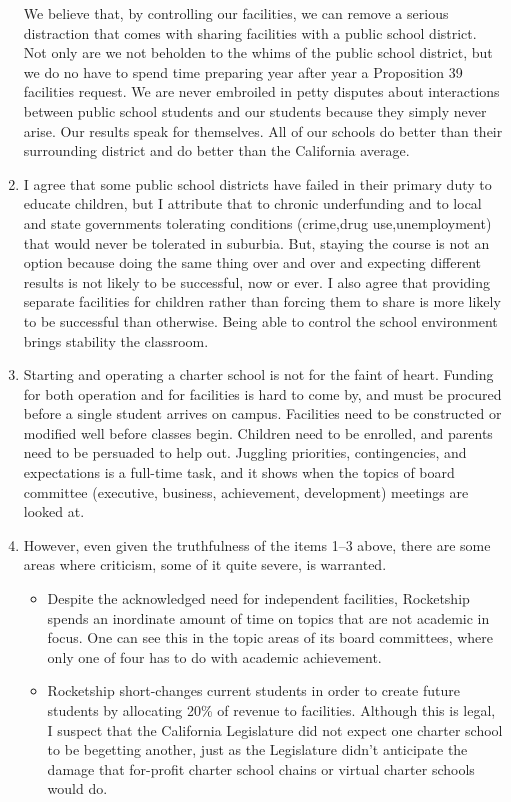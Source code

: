 \begin{enumerate}[topsep=0.3\baselineskip,itemsep=0.25\baselineskip]
  We believe that, by controlling our facilities, we can remove a serious distraction that comes with sharing facilities with a public school district. Not only are we not beholden to the whims of the public school district, but we do no have to spend time preparing year after year a Proposition 39 facilities request. We are never embroiled in petty disputes about interactions between public school students and our students because they simply never arise. Our results speak for themselves. All of our schools do better than their surrounding district and do better than the California average.
  \item I agree that some public school districts have failed in their primary duty to educate children, but I attribute that to chronic underfunding and to local and state governments tolerating conditions (crime,drug use,unemployment) that would never be tolerated in suburbia. But, staying the course is not an option because doing the same thing over and over and expecting different results is not likely to be successful, now or ever.
  I also agree that providing separate facilities for children rather than forcing them to share is more likely to be successful than otherwise. Being able to control the school environment brings stability the classroom.
  \item Starting and operating a charter school is not for the faint of heart. Funding for both operation and for facilities is hard to come by, and must be procured before a single student arrives on campus. Facilities need to be constructed or modified well before classes begin. Children need to be enrolled, and parents need to be persuaded to help out. Juggling priorities, contingencies, and expectations is a full-time task, and it shows when the topics of board committee (executive, business, achievement, development) meetings are looked at.
    \item However, even given the truthfulness of the items 1–3 above, there are some areas where criticism, some of it quite severe, is warranted.
    \begin{itemize}[topsep=0.125\baselineskip,itemsep=0.25\baselineskip]
      \item Despite the acknowledged need for independent facilities, Rocketship spends an inordinate amount of time on topics that are not academic in focus. One can see this in the topic areas of its board committees, where only one of four has to do with academic achievement.
      \item Rocketship short-changes current students in order to create future students by allocating 20\% of revenue to facilities. Although this is legal, I suspect that the California Legislature did not expect one charter school to be begetting another, just as the Legislature didn't anticipate the damage that for-profit charter school chains or virtual charter schools would do.

\end{itemize}
\end{enumerate}
